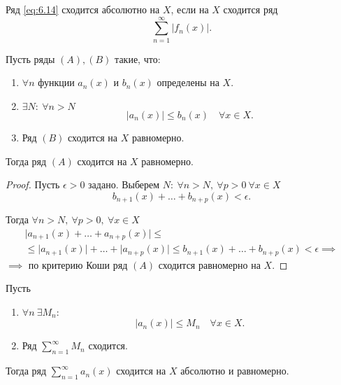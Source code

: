 

\begin{definition}
    Ряд \ref{eq:6.14} сходится абсолютно на $X$, если на $X$ сходится ряд
    \[
        \sum_{n=1}^{\infty}\big|f_n(x)\big|.
    \]
\end{definition}

\begin{theorem}
    Пусть ряды $ (A),(B) $ такие, что:
    \begin{enumerate}
        \item $\forall n$ функции $a_n(x)$ и $b_n(x)$ определены на $X$.
        \item $\exists N: \ \forall n > N$
              \[
                  \big|a_n(x)\big| \leqslant b_n(x) \quad \forall x \in X.
              \]
        \item Ряд $(B)$ сходится на $X$ равномерно.
    \end{enumerate}

    Тогда ряд $(A)$ сходится на $X$ равномерно.
\end{theorem}

\begin{proof}
    Пусть $\epsilon > 0$ задано. Выберем $N: \ \forall n > N, \ \forall p > 0 \ \forall x \in X$
    \[
        b_{n+1}(x) + \ldots + b_{n+p}(x) < \epsilon.
    \]

    Тогда $\forall n > N, \ \forall p > 0, \ \forall x \in X$
    \begin{multline*}
        \big|a_{n+1}(x) + \ldots + a_{n+p}(x)\big| \leqslant \\
        \leqslant \big|a_{n+1}(x)\big| + \ldots + \big|a_{n+p}(x)\big| \leqslant b_{n+1}(x) + \ldots + b_{n+p}(x) < \epsilon \implies
    \end{multline*}
    $\implies$ по критерию Коши ряд $(A)$ сходится равномерно на $X$.
\end{proof}

\begin{corollary}
    Пусть
    \begin{enumerate}
        \item $\forall n \ \exists M_n$:
              \[
                  \big|a_n(x)\big| \leqslant M_n \quad \forall x \in X.
              \]
        \item Ряд $\sum_{n=1}^{\infty} M_n$ сходится.
    \end{enumerate}

    Тогда ряд $\sum_{n=1}^{\infty}a_n(x)$ сходится на $X$ абсолютно и равномерно.
\end{corollary}


